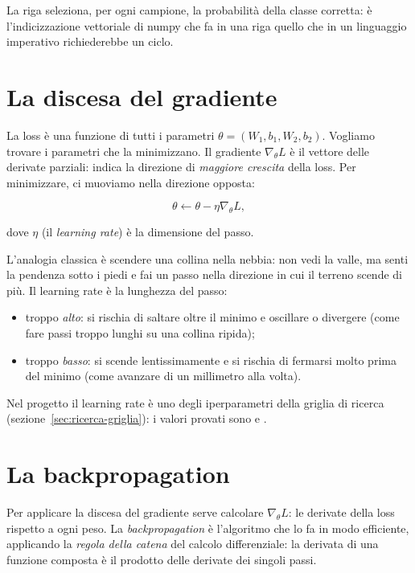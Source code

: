 La riga  seleziona, per ogni campione, la
probabilità della classe corretta: è l'indicizzazione vettoriale di numpy
che fa in una riga quello che in un linguaggio imperativo richiederebbe un
ciclo.

\section{La discesa del gradiente}\label{sec:discesa-gradiente}

La loss è una funzione di tutti i parametri $\theta = (W_1, b_1, W_2, b_2)$.
Vogliamo trovare i parametri che la minimizzano. Il gradiente
$\nabla_\theta L$ è il vettore delle derivate parziali: indica la direzione
di \emph{maggiore crescita} della loss. Per minimizzare, ci muoviamo nella
direzione opposta:

\begin{equation}
\theta \leftarrow \theta - \eta \nabla_\theta L,
\end{equation}

dove $\eta$ (il \emph{learning rate}) è la dimensione del passo.

L'analogia classica è scendere una collina nella nebbia: non vedi la valle,
ma senti la pendenza sotto i piedi e fai un passo nella direzione in cui il
terreno scende di più. Il learning rate è la lunghezza del passo:

\begin{itemize}
  \item troppo \emph{alto}: si rischia di saltare oltre il minimo e
        oscillare o divergere (come fare passi troppo lunghi su una collina
        ripida);
  \item troppo \emph{basso}: si scende lentissimamente e si rischia di
        fermarsi molto prima del minimo (come avanzare di un millimetro alla
        volta).
\end{itemize}

Nel progetto il learning rate è uno degli iperparametri della griglia di
ricerca (sezione~\ref{sec:ricerca-griglia}): i valori provati sono
 e .

\section{La backpropagation}\label{sec:backpropagation}

Per applicare la discesa del gradiente serve calcolare
$\nabla_\theta L$: le derivate della loss rispetto a ogni peso. La
\emph{backpropagation} è l'algoritmo che lo fa in modo efficiente,
applicando la \emph{regola della catena} del calcolo differenziale: la
derivata di una funzione composta è il prodotto delle derivate dei singoli
passi.

